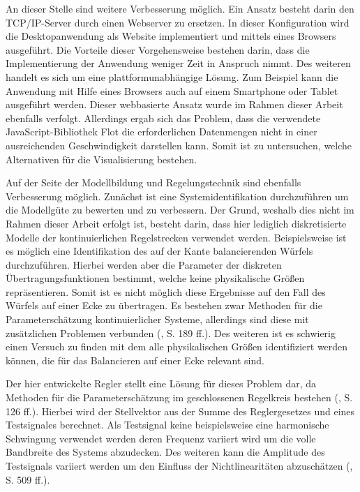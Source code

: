 An dieser Stelle sind weitere Verbesserung möglich. Ein Ansatz besteht darin den TCP/IP-Server durch einen Webserver zu ersetzen. In dieser Konfiguration wird die Desktopanwendung als Website implementiert und mittels eines Browsers ausgeführt. Die Vorteile dieser Vorgehensweise bestehen darin, dass die Implementierung der Anwendung weniger Zeit in Anspruch nimmt. Des weiteren handelt es sich um eine plattformunabhängige Lösung. Zum Beispiel kann die Anwendung mit Hilfe eines Browsers auch auf einem Smartphone oder Tablet ausgeführt werden. Dieser webbasierte Ansatz wurde im Rahmen dieser Arbeit ebenfalls verfolgt. Allerdings ergab sich das Problem, dass die verwendete JavaScript-Bibliothek Flot die erforderlichen Datenmengen nicht in einer ausreichenden Geschwindigkeit darstellen kann. Somit ist zu untersuchen, welche Alternativen für die Visualisierung bestehen.

Auf der Seite der Modellbildung und Regelungstechnik sind ebenfalls Verbesserung möglich. Zunächst ist eine Systemidentifikation durchzuführen um die Modellgüte zu bewerten und zu verbessern. Der Grund, weshalb dies nicht im Rahmen dieser Arbeit erfolgt ist, besteht darin, dass hier lediglich diskretisierte Modelle der kontinuierlichen Regelstrecken verwendet werden. Beispielsweise ist es möglich eine Identifikation des auf der Kante balancierenden Würfels durchzuführen. Hierbei werden aber die Parameter der diskreten Übertragungsfunktionen bestimmt, welche keine physikalische Größen repräsentieren. Somit ist es nicht möglich diese Ergebnisse auf den Fall des Würfels auf einer Ecke zu übertragen. Es bestehen zwar Methoden für die Parameterschätzung kontinuierlicher Systeme, allerdings sind diese mit zusätzlichen Problemen verbunden (\cite{UnbehauenSysId}, S. 189 ff.). Des weiteren ist es schwierig einen Versuch zu finden mit dem alle physikalischen Größen identifiziert werden können, die für das Balancieren auf einer Ecke relevant sind.

Der hier entwickelte Regler stellt eine Lösung für dieses Problem dar, da Methoden für die Parameterschätzung im geschlossenen Regelkreis bestehen (\cite{UnbehauenSysId}, S. 126 ff.). Hierbei wird der Stellvektor aus der Summe des Reglergesetzes und eines Testsignales berechnet. Als Testsignal keine beispielsweise eine harmonische Schwingung verwendet werden deren Frequenz variiert wird um die volle Bandbreite des Systems abzudecken. Des weiteren kann die Amplitude des Testsignals variiert werden um den Einfluss der Nichtlinearitäten abzuschätzen (\cite{UnbehauenSysId}, S. 509 ff.).


